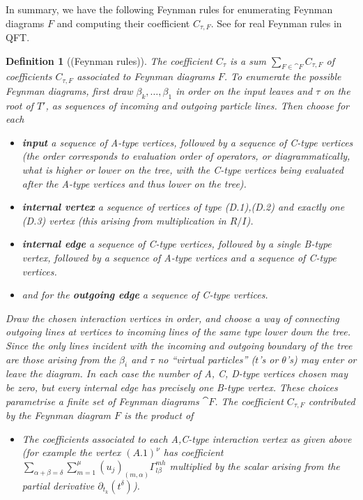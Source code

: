 \documentclass[english,letter paper,12pt,leqno]{article}
\theoremstyle{example}
\newtheorem{definition}[theorem]{Definition}
\numberwithin{equation}{section}
\begin{document}
In summary, we have the following Feynman rules for enumerating Feynman diagrams $F$ and computing their coefficient $C_{\tau, F}$. See \cite[\S 6.1]{weinberg} for real Feynman rules in QFT.

\begin{definition}[(Feynman rules)]\label{defn:feynman_rules} The coefficient $C_\tau$ is a sum $\sum_{F \in \cat{F}} C_{\tau, F}$ of coefficients $C_{\tau, F}$ associated to Feynman diagrams $F$. To enumerate the possible Feynman diagrams, first draw $\beta_k,\ldots,\beta_1$ in order on the input leaves and $\tau$ on the root of $T'$, as sequences of incoming and outgoing particle lines. Then choose for each
\begin{itemize}
\item \textbf{input} a sequence of A-type vertices, followed by a sequence of C-type vertices (the order corresponds to evaluation order of operators, or diagrammatically, what is higher or lower on the tree, with the C-type vertices being evaluated \emph{after} the A-type vertices and thus lower on the tree).
\item \textbf{internal vertex} a sequence of vertices of type (D.1),(D.2) and exactly one (D.3) vertex (this arising from multiplication in $R/I$).
\item \textbf{internal edge} a sequence of C-type vertices, followed by a single B-type vertex, followed by a sequence of A-type vertices and a sequence of C-type vertices.
\item and for the \textbf{outgoing edge} a sequence of C-type vertices.
\end{itemize}
Draw the chosen interaction vertices in order, and choose a way of connecting outgoing lines at vertices to incoming lines of the same type lower down the tree. Since the only lines incident with the incoming and outgoing boundary of the tree are those arising from the $\beta_i$ and $\tau$ no ``virtual particles'' ($t$'s or $\theta$'s) may enter or leave the diagram. In each case the number of A, C, D-type vertices chosen may be zero, but every internal edge has precisely one B-type vertex. These choices parametrise a finite set of Feynman diagrams $\cat{F}$. The coefficient $C_{\tau, F}$ contributed by the Feynman diagram $F$ is the product of
\begin{itemize}
\item[(i)] The coefficients associated to each A,C-type interaction vertex as given above (for example the vertex $(A.1)^{\nu}$ has coefficient $\sum_{\alpha + \beta = \delta } \sum_{m=1}^\mu (u_j)_{(m,\alpha)} \Gamma^{m h}_{l \beta}$ multiplied by the scalar arising from the partial derivative $\partial_{t_k}(t^\delta)$).

\end{itemize}
\end{definition}
\end{document}
